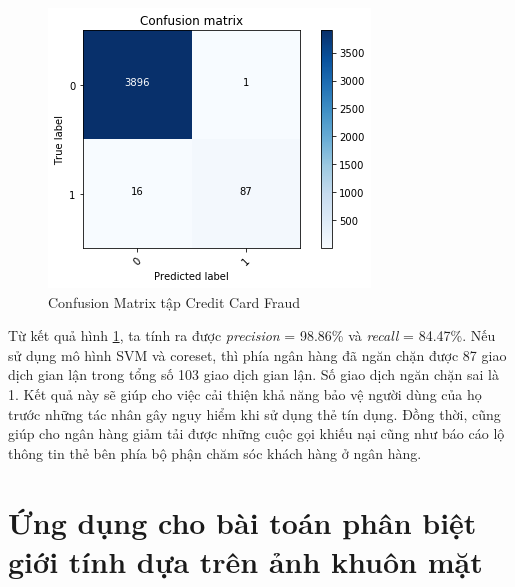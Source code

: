 \documentclass[a4paper, 12pt, oneside]{report}
\begin{document}
\begin{center}
    \begin{figure}[H]
    \begin{center}
     \includegraphics[scale=0.5]{Confusion_matrix_creditCardFraud.png}
    \end{center}
    \caption {Confusion Matrix tập Credit Card Fraud}
    \label{Hình 5.10}
    \end{figure}
\end{center}
Từ kết quả hình \ref{Hình 5.10}, ta tính ra được \textit{precision} = 98.86\% và \textit{recall} = 84.47\%. Nếu sử dụng mô hình SVM và coreset, thì phía ngân hàng đã ngăn chặn được 87 giao dịch gian lận trong tổng số 103 giao dịch gian lận. Số giao dịch ngăn chặn sai là 1. Kết quả này sẽ giúp cho việc cải thiện khả năng bảo vệ người dùng của họ trước những tác nhân gây nguy hiểm khi sử dụng thẻ tín dụng. Đồng thời, cũng giúp cho ngân hàng giảm tải được những cuộc gọi khiếu nại cũng như báo cáo lộ thông tin thẻ bên phía bộ phận chăm sóc khách hàng ở ngân hàng.

\section{Ứng dụng cho bài toán phân biệt giới tính dựa trên ảnh khuôn mặt}
\end{document}

